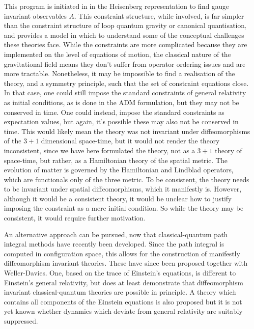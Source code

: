 \documentclass[aps,pra,showpacs,citeautoscript,amsmath,amssymb,floatfix,superscriptaddress,bbm, verbatim,amsfonts,changes,10pt,nofootinbib,longbibliography]{revtex4-1}
\begin{document}
This program is initiated in \cite{UCL2022constraints} in the Heisenberg representation to find gauge invariant observables $A$.
This constraint structure, while involved, is far simpler than the constraint structure of loop quantum gravity or canonical quantisation, and provides a model in which to understand some of the conceptual challenges these theories face.
While the constraints are more complicated because they are implemented on the level of equations of motion, the classical nature of the gravitational field means they don't suffer from operator ordering issues and are more tractable. Nonetheless, it may be  impossible to find a realisation of the theory, and a symmetry principle, such that the set of constraint equations close. In that case, one could still impose the standard constraints of general relativity as initial conditions, as is done in the ADM formulation, but they may not be conserved in time. One could instead, impose the standard constraints as expectation values, but again, it's possible these may also not be conserved in time. This would likely mean the theory was not invariant under diffeomorphisms of the $3+1$ dimensional space-time, but it would not render the theory inconsistent, since we have here formulated the theory, not as a $3+1$ theory of space-time, but rather, 
 as a Hamiltonian theory of the spatial metric. The evolution of matter is governed by the Hamiltonian and Lindblad operators, which are functionals only of the three metric. To be consistent, the theory needs to be invariant under spatial diffeomorphisms, which it manifestly is. However, although it would be a consistent theory, it would be unclear how to justify imposing the constraint as a mere initial condition. So while the theory may be consistent, it would require further motivation. 
 
 An alternative approach can  be pursued, now that classical-quantum path integral methods have recently been developed\cite{oppenheim2023path}.  Since the path integral is computed in configuration space, this allows for the construction of manifestly diffeomorphism invariant theories. These have since been proposed together with Weller-Davies\cite{oppenheim2023covariant}. One, based on the trace of Einstein's equations, is different to Einstein's general relativity, but does at least demonstrate that diffeomorphism invariant classical-quantum theories are possible in principle. A theory which contains all components of the Einstein equations is also proposed but it is not yet known whether dynamics which deviate from general relativity are suitably suppressed. 
\end{document}
